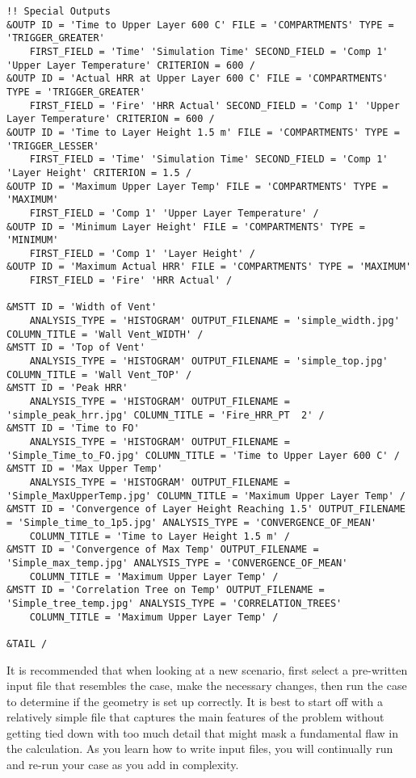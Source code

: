 \begin{lstlisting}[basicstyle=\tiny]
!! Special Outputs
&OUTP ID = 'Time to Upper Layer 600 C' FILE = 'COMPARTMENTS' TYPE = 'TRIGGER_GREATER'
    FIRST_FIELD = 'Time' 'Simulation Time' SECOND_FIELD = 'Comp 1' 'Upper Layer Temperature' CRITERION = 600 /
&OUTP ID = 'Actual HRR at Upper Layer 600 C' FILE = 'COMPARTMENTS' TYPE = 'TRIGGER_GREATER'
    FIRST_FIELD = 'Fire' 'HRR Actual' SECOND_FIELD = 'Comp 1' 'Upper Layer Temperature' CRITERION = 600 /
&OUTP ID = 'Time to Layer Height 1.5 m' FILE = 'COMPARTMENTS' TYPE = 'TRIGGER_LESSER'
    FIRST_FIELD = 'Time' 'Simulation Time' SECOND_FIELD = 'Comp 1' 'Layer Height' CRITERION = 1.5 /
&OUTP ID = 'Maximum Upper Layer Temp' FILE = 'COMPARTMENTS' TYPE = 'MAXIMUM'
    FIRST_FIELD = 'Comp 1' 'Upper Layer Temperature' /
&OUTP ID = 'Minimum Layer Height' FILE = 'COMPARTMENTS' TYPE = 'MINIMUM'
    FIRST_FIELD = 'Comp 1' 'Layer Height' /
&OUTP ID = 'Maximum Actual HRR' FILE = 'COMPARTMENTS' TYPE = 'MAXIMUM'
    FIRST_FIELD = 'Fire' 'HRR Actual' /

&MSTT ID = 'Width of Vent' 
    ANALYSIS_TYPE = 'HISTOGRAM' OUTPUT_FILENAME = 'simple_width.jpg' COLUMN_TITLE = 'Wall Vent_WIDTH' /
&MSTT ID = 'Top of Vent' 
    ANALYSIS_TYPE = 'HISTOGRAM' OUTPUT_FILENAME = 'simple_top.jpg' COLUMN_TITLE = 'Wall Vent_TOP' /
&MSTT ID = 'Peak HRR' 
    ANALYSIS_TYPE = 'HISTOGRAM' OUTPUT_FILENAME = 'simple_peak_hrr.jpg' COLUMN_TITLE = 'Fire_HRR_PT  2' /
&MSTT ID = 'Time to FO' 
    ANALYSIS_TYPE = 'HISTOGRAM' OUTPUT_FILENAME = 'Simple_Time_to_FO.jpg' COLUMN_TITLE = 'Time to Upper Layer 600 C' /
&MSTT ID = 'Max Upper Temp' 
    ANALYSIS_TYPE = 'HISTOGRAM' OUTPUT_FILENAME = 'Simple_MaxUpperTemp.jpg' COLUMN_TITLE = 'Maximum Upper Layer Temp' /
&MSTT ID = 'Convergence of Layer Height Reaching 1.5' OUTPUT_FILENAME = 'Simple_time_to_1p5.jpg' ANALYSIS_TYPE = 'CONVERGENCE_OF_MEAN'
    COLUMN_TITLE = 'Time to Layer Height 1.5 m' /
&MSTT ID = 'Convergence of Max Temp' OUTPUT_FILENAME = 'Simple_max_temp.jpg' ANALYSIS_TYPE = 'CONVERGENCE_OF_MEAN'
    COLUMN_TITLE = 'Maximum Upper Layer Temp' /
&MSTT ID = 'Correlation Tree on Temp' OUTPUT_FILENAME = 'Simple_tree_temp.jpg' ANALYSIS_TYPE = 'CORRELATION_TREES'
    COLUMN_TITLE = 'Maximum Upper Layer Temp' /

&TAIL /
\end{lstlisting}
It is recommended that when looking at a new scenario, first select a pre-written input file that resembles the case, make the necessary changes, then run the case to determine if the geometry is set up correctly. It is best to start off with a relatively simple file that captures the main features of the problem without getting tied down with too much detail that might mask a fundamental flaw in the calculation. As you learn how to write input files, you will continually run and re-run your case as you add in complexity.

